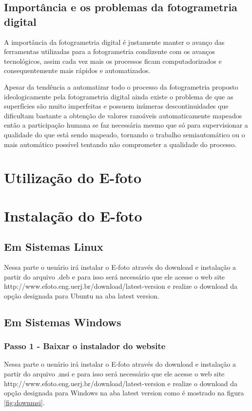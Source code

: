 \subsection{Importância e os problemas da fotogrametria digital}
A importância da fotogrametria digital é justamente manter o avanço das ferramentas utilizadas para a fotogrametria condizente com os avanços tecnológicos, assim cada vez mais os processos ficam computadorizados e consequentemente mais rápidos e automatizados.

Apesar da tendência a automatizar todo o processo da fotogrametria proposto ideologicamente pela fotogrametria digital ainda existe o problema de que as superfícies são muito imperfeitas e possuem inúmeras descontinuidades que dificultam bastante a obtenção de valores razoáveis automaticamente mapeados então a participação humana se faz necessária mesmo que só para supervisionar a qualidade do que está sendo mapeado, tornando o trabalho semiautomático ou o mais automático possível tentando não comprometer a qualidade do processo.


\section{Utilização do E-foto}





\section{Instalação do E-foto}
\subsection{Em Sistemas Linux}
Nessa parte o usuário irá instalar o E-foto através do download e instalação a partir do arquivo .deb e para isso será necessário que ele acesse o web site http://www.efoto.eng.uerj.br/download/latest-version e realize o download da opção designada para Ubuntu na aba latest version.
\subsection{Em Sistemas Windows}
\subsubsection{Passo 1 - Baixar o instalador do website}
Nessa parte o usuário irá instalar o E-foto através do download e instalação a partir do arquivo .msi e para isso será necessário que ele acesse o web site http://www.efoto.eng.uerj.br/download/latest-version e realize o download da opção designada para Windows na aba latest version como é mostrado na figura \ref{fig:downmsi}.

